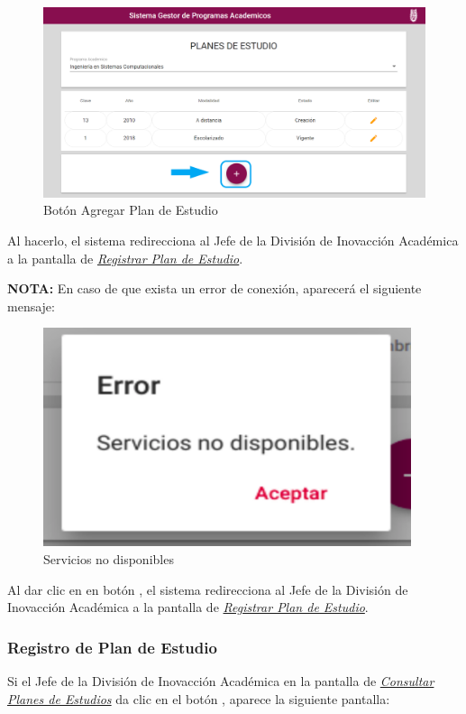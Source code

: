 \begin{figure}[H]
	\centering
	\hypertarget{add}{\includegraphics[width=0.7\linewidth]{images/SP4-GPE/mas}}
	\caption{Botón Agregar Plan de Estudio}
	\label{add}
\end{figure}

Al hacerlo, el sistema redirecciona al Jefe de la División de Inovacción Académica a la pantalla de \hyperlink{registrarPE}{\textit{Registrar Plan de Estudio}}.


\textbf{NOTA:} En caso de que exista un error de conexión, aparecerá el siguiente mensaje:
	\begin{figure}[H]
	\centering
	\hypertarget{error}{\includegraphics[width=0.7\linewidth]{images/SP4-GPE/error}}
	\caption{Servicios no disponibles}
	\label{error}
\end{figure}

Al dar clic en en botón , el sistema redirecciona  al Jefe de la División de Inovacción Académica a la pantalla de \hyperlink{registrarPE}{\textit{Registrar Plan de Estudio}}.
\newpage
\subsubsection{Registro de Plan de Estudio}
Si el Jefe de la División de Inovacción Académica en la pantalla de \hyperlink{consultarPE}{\textit{Consultar Planes de Estudios}} da clic en el botón \IUbutton{+}, aparece la siguiente pantalla:

